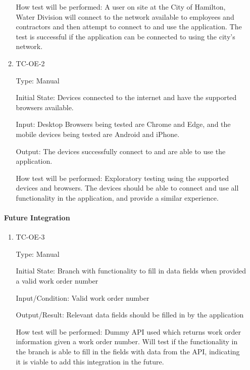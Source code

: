 \documentclass[12pt, titlepage]{article}
\begin{document}
\begin{enumerate}
\begin{enumerate}
        How test will be performed: A user on site at the City of
        Hamilton, Water Division will connect to the network available to
        employees and contractors and then attempt to connect to and use
        the application. The test is successful if the application can be
        connected to using the city's network.

      \item{TC-OE-2\\}

        Type: Manual

        Initial State: Devices connected to the internet and have the
        supported browsers available.

        Input: Desktop Browsers being tested are Chrome and Edge, and the
        mobile devices being tested are Android and iPhone.

        Output: The devices successfully connect to and are able to use
        the application.

        How test will be performed: Exploratory testing using the
        supported devices and browsers. The devices should be able to
        connect and use all functionality in the application, and provide
        a similar experience.

    \end{enumerate}

    \paragraph{Future Integration}

    \begin{enumerate}

      \item{TC-OE-3\\}

        Type: Manual

        Initial State: Branch with functionality to fill in data fields
        when provided a valid work order number

        Input/Condition: Valid work order number

        Output/Result: Relevant data fields should be filled in by
        the application

        How test will be performed: Dummy API used which returns work
        order information given a work order number. Will test if the
        functionality in the branch is able to fill in the fields with
        data from the API, indicating it is viable to add this
        integration in the future.


\end{enumerate}
\end{enumerate}
\end{document}
